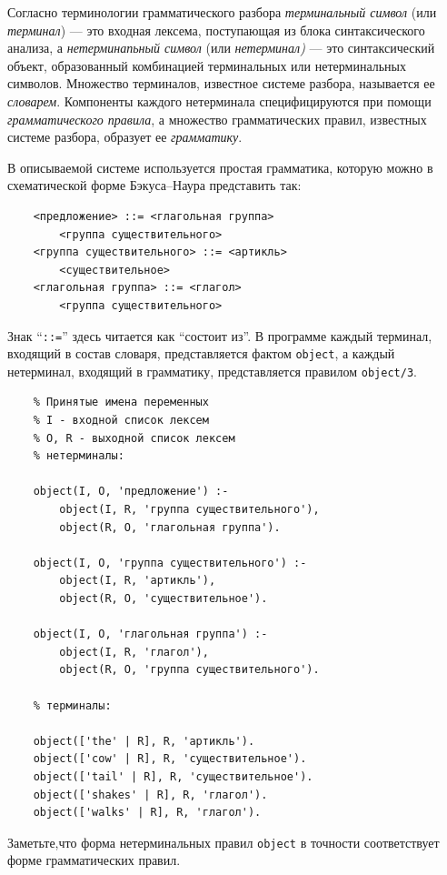 \documentclass[12pt, openany, twoside]{book} %
\begin{document}
Согласно терминологии грамматического разбора \emph{терминальный символ} (или \emph{терминал}) --- это входная лексема, поступающая из блока синтаксического анализа, а \emph{нетерминапьный символ} (или \emph{нетерминал)} --- это синтаксический объект, образованный комбинацией терминальных или нетерминальных символов. Множество терминалов, известное системе разбора, называется ее \emph{словарем}. Компоненты каждого нетерминала специфицируются при помощи \emph{грамматического правила}, а множество грамматических правил, известных системе разбора, образует ее \emph{грамматику}.

В описываемой системе используется простая грамматика, которую можно в схематической форме Бэкуса--Наура представить так:
{\tt\begin{verbatim}
    <предложение> ::= <глагольная группа>
        <группа существительного>
    <группа существительного> ::= <артикль>
        <существительное>
    <глагольная группа> ::= <глагол>
        <группа существительного>
\end{verbatim}}

Знак ``{\tt ::=}'' здесь читается как ``состоит из''. В программе каждый терминал, входящий в состав словаря, представляется фактом {\tt object}, а каждый нетерминал, входящий в грамматику, представляется правилом {\tt object/3}.
{\tt\begin{verbatim}
    % Принятые имена переменных
    % I - входной список лексем
    % О, R - выходной список лексем
    % нетерминалы:

    object(I, О, 'предложение') :-
        object(I, R, 'группа существительного'),
        object(R, О, 'глагольная группа').

    object(I, О, 'группа существительного') :-
        object(I, R, 'артикль'),
        object(R, О, 'существительное').

    object(I, О, 'глагольная группа') :-
        object(I, R, 'глагол'),
        object(R, О, 'группа существительного').

    % терминалы:

    object(['the' | R], R, 'артикль').
    object(['cow' | R], R, 'существительное').
    object(['tail' | R], R, 'существительное').
    object(['shakes' | R], R, 'глагол').
    object(['walks' | R], R, 'глагол').
\end{verbatim}}

\noindent Заметьте,что форма нетерминальных правил {\tt object} в точности соответствует форме грамматических правил.
\end{document}
